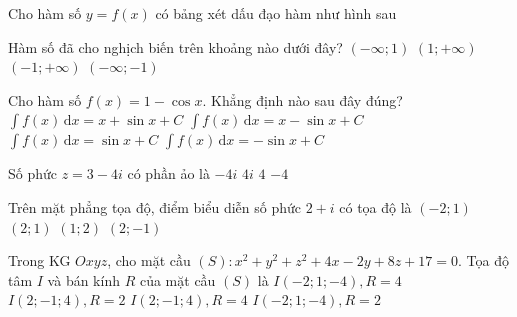 \begin{ex}%
Cho hàm số $y=f(x)$ có bảng xét dấu đạo hàm như hình sau
\begin{center}
\end{center}
Hàm số đã cho nghịch biến trên khoảng nào dưới đây?
\choice
{$(-\infty ;1)$}
{$(1;+\infty)$}
{$(-1;+\infty)$}
{\True $(-\infty ;-1)$}
\loigiai{
}
\end{ex}



\begin{ex}%
Cho hàm số $f(x)=1-\cos x$. Khẳng định nào sau đây đúng?
\choice
{$\displaystyle\int f(x) \mathrm{\,d}x =x+\sin x+C$}
{\True $\displaystyle\int f(x) \mathrm{\,d}x =x-\sin x+C$}
{$\displaystyle\int f(x)\mathrm{\,d}x =\sin x+C$}
{$\displaystyle\int f(x)\mathrm{\,d}x =-\sin x+C$}
\end{ex}



\begin{ex}%
Số phức $z=3-4i$ có phần ảo là
\choice
{$-4i$}
{$4i$}
{$4$}
{\True $-4$}
\end{ex}


\begin{ex}%
Trên mặt phẳng tọa độ, điểm biểu diễn số phức $2+i$ có tọa độ là
\choice
{$(-2;1)$}
{\True $(2;1)$}
{$(1;2)$}
{$(2;-1)$}
\end{ex}

\begin{ex}%
	Trong KG $Oxyz$, cho mặt cầu $(S)\colon x^2+y^2+z^2+4x-2y+8z+17=0$. Tọa độ tâm $I$ và bán kính $R$ của mặt cầu $(S)$ là
	\choice
	{$I(-2;1;-4), R=4$ }
	{\True $I(2;-1;4), R=2$}
	{$I(2;-1;4), R=4$}
	{\True$I(-2;1;-4), R=2$}
\end{ex}

